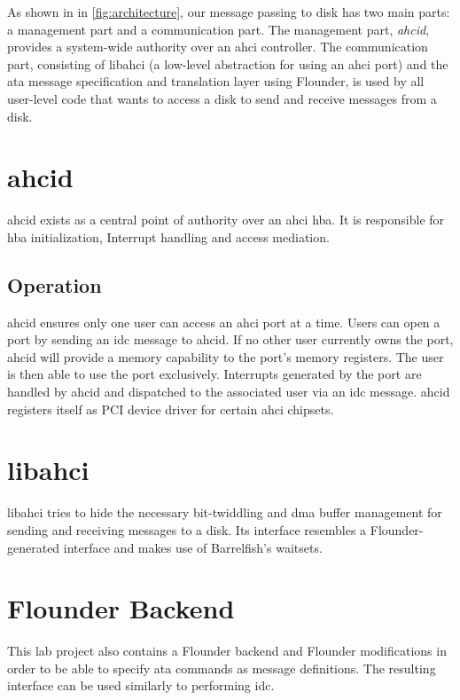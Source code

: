 As shown in in \autoref{fig:architecture}, our message passing to disk has two
main parts: a management part and a communication part. The management part,
\emph{ahcid}, provides a system-wide authority over an \ac{ahci} controller.
The communication part, consisting of libahci (a low-level abstraction for
using an \ac{ahci} port) and the \ac{ata} message specification and translation
layer using Flounder, is used by all user-level code that wants to access a
disk to send and receive messages from a disk.

\section{ahcid}

ahcid exists as a central point of authority over an \ac{ahci} \ac{hba}. It is
responsible for \ac{hba} initialization, Interrupt handling and access
mediation.

\subsection{Operation}

ahcid ensures only one user can access an \ac{ahci} port at a time. Users can
open a port by sending an \acs{idc} message to ahcid. If no other user
currently owns the port, ahcid will provide a memory capability to the port's
memory registers.  The user is then able to use the port exclusively.
Interrupts generated by the port are handled by ahcid and dispatched to the
associated user via an \acs{idc} message. ahcid registers itself as PCI device
driver for certain \ac{ahci} chipsets.

\section{libahci}

libahci tries to hide the necessary bit-twiddling and \acs{dma} buffer
management for sending and receiving messages to a disk. Its interface
resembles a Flounder-generated interface and makes use of Barrelfish's
waitsets.

\section{Flounder Backend}

This lab project also contains a Flounder backend and Flounder modifications in
order to be able to specify \ac{ata} commands as message definitions. The
resulting interface can be used similarly to performing \acs{idc}.

